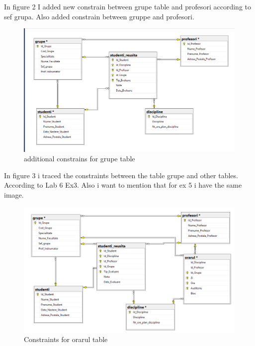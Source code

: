 \documentclass[12pt]{article}
\begin{document}
       In figure 2 I added new constrain between grupe table and profesori according to sef grupa. Also added constrain between gruppe and profesori.
        \begin{figure}[H]
                \centering
                \includegraphics[width=\textwidth]{img2.png}
                \caption{additional constrains for grupe table}
        \end{figure}
        \vspace{0.5 cm}

        In figure 3 i traced the constraints between the table grupe and other tables. According to Lab 6  Ex3. Also i want to mention that for ex 5 i have the same image.
        \begin{figure}[H]
                \centering
                \includegraphics[width = \textwidth]{img3.png}
                \caption{Constraints for orarul table}
        \end{figure}
        \vspace{0.5 cm}
\end{document}
